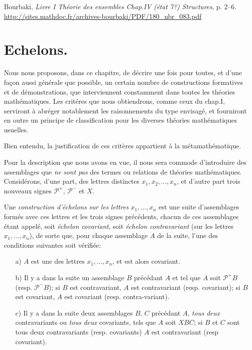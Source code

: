 \documentclass{article}
\newcommand{\Pp}{\mathcal{P}^+}
\newcommand{\Pm}{\mathcal{P}^-}
\begin{document}
\noindent
Bourbaki, \emph{Livre I Th\'eorie des ensembles Chap.IV (\'etat 7?)
  Structures}, p. 2--6.
\url{http://sites.mathdoc.fr/archives-bourbaki/PDF/180_nbr_083.pdf}

\section*{Echelons.}

Nous nous proposons, dans ce chapitre, de d\'ecrire une fois pour
toutes, et d'une fa{\c c}on aussi g\'en\'erale que possible, un
certain nombre de constructions formatives et de d\'emonstrations, que
interviennent constamment dans toutes les th\'eories math\'ematiques.
Les crit\'eres que nous obtiendrons, comme ceux du chap.I, serviront
\`a abr\'eger notablement les raisonnements du type envisag\'e, et
fourniront en outre un principe de classification pour les diverses
th\'eories math\'ematiques usuelles.

Bien entendu, la justification de ces crit\`eres appartient \`a la
m\'etamath\'ematique.

Pour la description que nous avons en vue, il nous sera commode
d'introduire des assemblages que \emph{ne sont pas} des termes ou
relations de th\'eories math\'ematiques.  Consid\'erons, d'une part,
des lettres distinctes $x_1, x_2, \dots, x_n$, et d'autre part trois
nouveaux signes $\Pp$, $\Pm$ et $X$.

Une \emph{construction d'\'echelons sur les lettres} $x_1, \dots, x_n$
est une suite d'assemblages form\'es avec ces lettres et les trois
signes pr\'ec\'edents, chacun de ces assemblages \'etant appel\'e,
soit \emph{\'echelon covariant}, soit \emph{\'echelon contravariant}
(sur les lettres $x_1, \dots, x_n$), de sorte que, pour chaque
assemblage $A$ de la suite, l'une des conditions suivantes soit
v\'erifi\'ee:
\begin{enumerate}
\item[a)] $A$ est une des lettres $x_1, \dots, x_n$, et est alors covariant.
\item[b)] Il y a dans la suite un assemblage $B$ pr\'ec\'edant $A$ et
  tel que $A$ soit $\Pp B$ (resp. $\Pm B$); si $B$ est contravariant,
  $A$ est contravariant (resp. covariant); si $B$ est covariant, $A$
  est covariant (resp. contra-variant).
\item[c)] Il y a dans la suite deux assemblages $B$, $C$ pr\'ec\'edant
  $A$, \emph{tous deux} contravariants ou \emph{tous deux} covariants,
  tels que $A$ soit $X B C$; si $B$ et $C$ sont tous deux
  contravariants (resp. covariants) $A$ est contravariant (resp
  covariant).
\end{enumerate}
\end{document}
